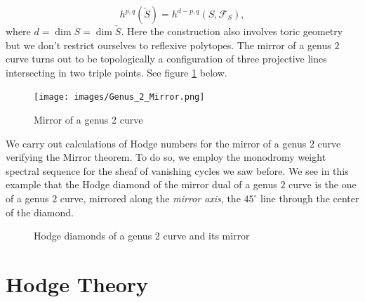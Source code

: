 \documentclass{article}
\newcommand{\calF}{\mathcal{F}}
\numberwithin{equation}{section}
\begin{document}
\[
h^{p,q}(\check{S})= h^{d-p,q}(S,\calF_S),
\]
where $d=\dim S = \dim \check{S}$.
Here the construction also involves toric geometry but we don't restrict ourselves to reflexive polytopes. The mirror of a genus $2$ curve turns out to be topologically a configuration of three projective lines intersecting in two triple points. See figure \ref{genus2mirror} below.
\begin{figure}[ht!]
\centering
    \texttt{[image: images/Genus\_2\_Mirror.png]}
    \caption{Mirror of a genus 2 curve}
    \label{genus2mirror}
\end{figure}
We carry out calculations of Hodge numbers for the mirror of a genus $2$ curve verifying the Mirror theorem.  To do so, we employ the monodromy weight spectral sequence for the sheaf of vanishing cycles we saw before. We see in this example that the Hodge diamond of the mirror dual of a genus $2$ curve is the one of a genus $2$ curve, mirrored along the \emph{mirror axis}, the $45^\circ$ line through the center of the diamond.

\begin{figure}[ht]
  \begin{subfigure}[b]{0.4\textwidth}
    \centering 
{}
    \label{S_check_Hodge_diamond}
  \end{subfigure}
  \hfill
  \begin{subfigure}[b]{0.4\textwidth}
 \centering 
{}
    \label{ScalF_S_diamond}
  \end{subfigure}
  \caption{Hodge diamonds of a genus 2 curve and its mirror}
\end{figure}




\section{Hodge Theory}

\end{document}
